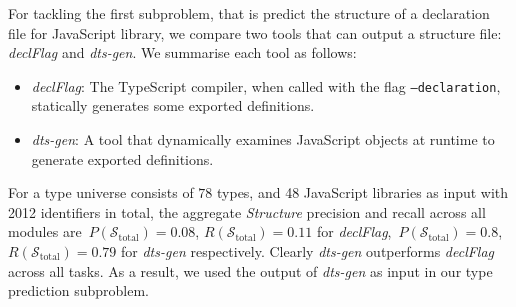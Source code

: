 \documentclass[sigplan,10pt,review,anonymous]{acmart} %
\theoremstyle{plain}
\theoremstyle{remark}
\theoremstyle{definition}
\begin{document}

For tackling the first subproblem, that is predict the structure of a declaration file for JavaScript library, we compare two tools that can output a structure file: \textit{declFlag} and \textit{dts-gen}.
We summarise each tool as follows:
\begin{itemize}[label={\tiny$\bullet$}]
	\item \textit{declFlag}: The TypeScript compiler, when called with the flag
	      \texttt{--declaration}, statically generates some exported definitions.
	\item \textit{dts-gen}: A tool that dynamically examines JavaScript objects at
	      runtime to generate exported definitions.
\end{itemize}
For a type universe consists of $78$ types, and 48 JavaScript libraries as input with 2012 identifiers in total, the aggregate \textit{Structure} precision and recall across all modules are~$P(\mathcal{S}_\text{total}) = 0.08$,
$R(\mathcal{S}_\text{total}) = 0.11$ for \textit{declFlag},~$P(\mathcal{S}_\text{total}) = 0.8$,
$R(\mathcal{S}_\text{total}) = 0.79$ for \textit{dts-gen} respectively.
Clearly \textit{dts-gen} outperforms \textit{declFlag} across all tasks.
As a result, we used the output of \textit{dts-gen} as input in our type prediction subproblem. 
\end{document}

